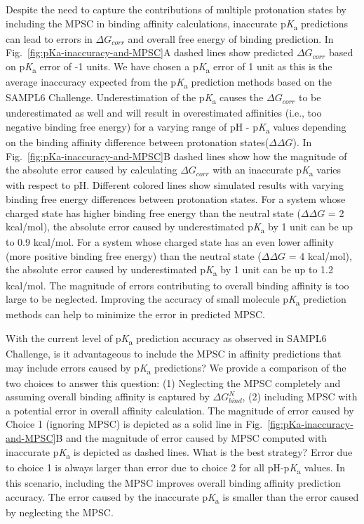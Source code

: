 \documentclass[9pt,lineno,final]{elife}
\newcommand{\pKa}{p\textit{K}\textsubscript{a}}
\begin{document}
Despite the need to capture the contributions of multiple protonation states by including the MPSC in binding affinity calculations, inaccurate \pKa{} predictions can lead to errors in $\Delta G_{corr}$ and overall free energy of binding prediction. 
In Fig.~\ref{fig:pKa-inaccuracy-and-MPSC}A dashed lines show predicted $\Delta G_{corr}$ based on \pKa{} error of -1 units. 
We have chosen a \pKa{} error of 1 unit as this is the average inaccuracy expected from the \pKa{} prediction methods based on the SAMPL6 Challenge.
Underestimation of the \pKa{} causes the $\Delta G_{corr}$ to be underestimated as well and will result in overestimated affinities (i.e., too negative binding free energy) for a varying range of pH - \pKa{} values depending on the binding affinity difference between protonation states($\Delta\Delta G$).
In Fig.~\ref{fig:pKa-inaccuracy-and-MPSC}B dashed lines show how the magnitude of the absolute error caused by calculating $\Delta G_{corr}$ with an inaccurate \pKa{} varies with respect to pH. 
Different colored lines show simulated results with varying binding free energy differences between protonation states. 
For a system whose charged state has higher binding free energy than the neutral state ($\Delta\Delta G$ = 2 kcal/mol), the absolute error caused by underestimated \pKa{} by 1 unit can be up to 0.9 kcal/mol.
For a system whose charged state has an even lower affinity (more positive binding free energy) than the neutral state ($\Delta\Delta G$ = 4 kcal/mol), the absolute error caused by underestimated \pKa{} by 1 unit can be up to 1.2 kcal/mol.
The magnitude of errors contributing to overall binding affinity is too large to be neglected. Improving the accuracy of small molecule \pKa{} prediction methods can help to minimize the error in predicted MPSC.

With the current level of \pKa{} prediction accuracy as observed in SAMPL6 Challenge, is it advantageous to include the MPSC in affinity predictions that may include errors caused by \pKa{} predictions? 
We provide a comparison of the two choices to answer this question: (1) Neglecting the MPSC completely and assuming overall binding affinity is captured by $\Delta G_{bind}^{N}$, (2) including MPSC with a potential error in overall affinity calculation. 
The magnitude of error caused by Choice 1 (ignoring MPSC) is depicted as a solid line in Fig.~\ref{fig:pKa-inaccuracy-and-MPSC}B and the magnitude of error caused by MPSC computed with inaccurate \pKa{}  is depicted as dashed lines. 
What is the best strategy? 
Error due to choice 1 is always larger than error due to choice 2 for all pH-\pKa{} values. 
In this scenario, including the MPSC improves overall binding affinity prediction accuracy.
The error caused by the inaccurate \pKa{} is smaller than the error caused by neglecting the MPSC. 
\end{document}
